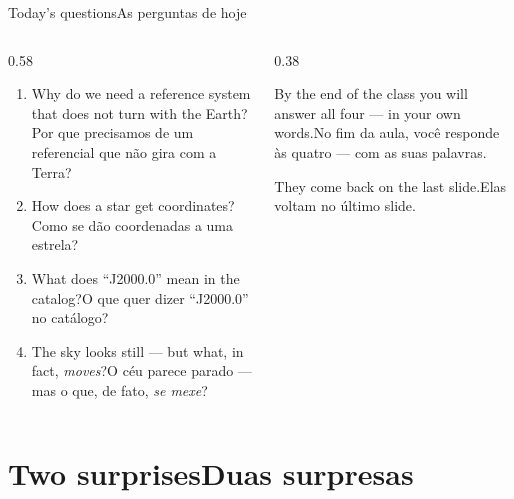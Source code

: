 \documentclass[aspectratio=169,11pt]{beamer}
\newcommand{\tr}[2]{\ifEN#2\else#1\fi}
\begin{document}
\begin{frame}{\tr{As perguntas de hoje}{Today's questions}}
  \begin{columns}[T]
    \begin{column}{0.58\textwidth}
      \begin{enumerate}
        \setlength{\itemsep}{8pt}
        \item \tr{Por que precisamos de um referencial que não gira com a Terra?}{Why do we need
              a reference system that does not turn with the Earth?}
        \item \tr{Como se dão coordenadas a uma estrela?}{How does a star get coordinates?}
        \item \tr{O que quer dizer ``J2000.0'' no catálogo?}{What does ``J2000.0'' mean in the
              catalog?}
        \item \tr{O céu parece parado --- mas o que, de fato, \emph{se mexe}?}{The sky looks
              still --- but what, in fact, \emph{moves}?}
      \end{enumerate}
    \end{column}
    \begin{column}{0.38\textwidth}
      \begin{ideia}[title={\tr{Combinado}{Deal}}]
        \tr{No fim da aula, você responde às quatro --- com as suas palavras.}{By the end of the
        class you will answer all four --- in your own words.}
        \medskip

        \tr{Elas voltam no último slide.}{They come back on the last slide.}
      \end{ideia}
    \end{column}
  \end{columns}
\end{frame}

\section{\tr{Duas surpresas}{Two surprises}}
\end{document}
